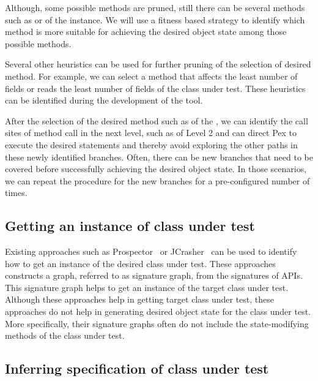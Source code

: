 Although, some possible methods are pruned, still there can be several methods such as  or  of the  instance. We will use a fitness based strategy to identify which method is more suitable for achieving the desired object state among those possible methods.

Several other heuristics can be used for further pruning of the selection of desired method. For example, we can select a method that affects the least number of fields or reads the least number of fields of the class under test. These heuristics can be identified during the development of the tool.

After the selection of the desired method such as  of the , we can identify the call sites of method call in the next level, such as  of Level 2 and can direct Pex to execute the desired statements and thereby avoid exploring the other paths in these newly identified branches. Often, there can be new branches that need to be covered before successfully achieving the desired object state. In those scenarios, we can repeat the procedure for the new branches for a pre-configured number of times.

\subsection{Getting an instance of class under test}

Existing approaches such as Prospector~\cite{prospector:jungloid} or JCrasher~\cite{csallner:jcrasher} can be used to identify how to get an instance of the desired class under test. These approaches constructs a graph, referred to as signature graph, from the signatures of APIs. This signature graph helps to get an instance of the target class under test. Although these approaches help in getting target class under test, these approaches do not help in generating desired object state for the class under test. More specifically, their signature graphs often do not include the state-modifying methods of the class under test.

\subsection{Inferring specification of class under test}


